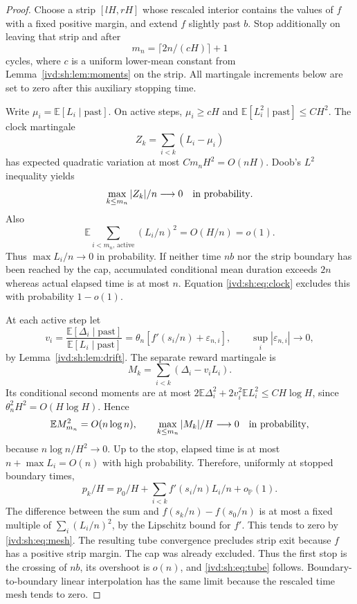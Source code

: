 \documentclass[11pt,letterpaper]{article}
\theoremstyle{remark}\newtheorem{remark}[theorem]{Remark}
\numberwithin{equation}{section}
\newcommand{\Prob}{\mathbb P}\newcommand{\E}{\mathbb E}
\begin{document}
\begin{proof}
Choose a strip $[lH,rH]$ whose rescaled interior contains the values
of $f$ with a fixed positive margin, and extend $f$ slightly past $b$.
Stop additionally on leaving that strip and after
\[
 m_n=\lceil2n/(cH)\rceil+1
\]
cycles, where $c$ is a uniform lower-mean constant from
Lemma~\ref{ivd:sh:lem:moments} on the strip. All martingale increments below
are set to zero after this auxiliary stopping time.

Write $\mu_i=\E[L_i\mid\text{past}]$. On active steps,
$\mu_i\ge cH$ and $\E[L_i^2\mid\text{past}]\le CH^2$.
The clock martingale
\[
 Z_k=\sum_{i<k}(L_i-\mu_i)
\]
has expected quadratic variation at most $Cm_nH^2=O(nH)$.
Doob's $L^2$ inequality yields
\begin{equation}\label{ivd:sh:eq:clock}
 \max_{k\le m_n}|Z_k|/n\longrightarrow0
 \quad\hbox{in probability}.
\end{equation}
Also
\begin{equation}\label{ivd:sh:eq:mesh}
 \E\sum_{i<m_n,\,\mathrm{active}}(L_i/n)^2=O(H/n)=o(1).
\end{equation}
Thus $\max L_i/n\to0$ in probability. If neither time $nb$ nor
the strip boundary has been reached by the cap, accumulated conditional
mean duration exceeds $2n$ whereas actual elapsed time is at most $n$.
Equation \eqref{ivd:sh:eq:clock} excludes this with probability $1-o(1)$.

At each active step let
\[
 v_i=\frac{\E[\Delta_i\mid\text{past}]}{\E[L_i\mid\text{past}]}
     =\theta_n[f'(s_i/n)+\varepsilon_{n,i}],
 \qquad \sup_i|\varepsilon_{n,i}|\to0,
\]
by Lemma~\ref{ivd:sh:lem:drift}. The separate reward martingale is
\[
 M_k=\sum_{i<k}(\Delta_i-v_iL_i).
\]
Its conditional second moments are at most
$2\E\Delta_i^2+2v_i^2\E L_i^2\le CH\log H$,
since $\theta_n^2H^2=O(H\log H)$. Hence
\begin{equation}\label{ivd:sh:eq:reward}
 \E M_{m_n}^2=O(n\log n),\qquad
 \max_{k\le m_n}|M_k|/H\longrightarrow0
 \quad\hbox{in probability},
\end{equation}
because $n\log n/H^2\to0$.
Up to the stop, elapsed time is at most $n+\max L_i=O(n)$ with
high probability. Therefore, uniformly at stopped boundary times,
\[
 p_k/H=p_0/H+\sum_{i<k}f'(s_i/n)L_i/n+o_{\Prob}(1).
\]
The difference between the sum and
$f(s_k/n)-f(s_0/n)$ is at most a fixed multiple of
$\sum_i(L_i/n)^2$, by the Lipschitz bound for $f'$.
This tends to zero by \eqref{ivd:sh:eq:mesh}.
The resulting tube convergence precludes strip exit because $f$ has
a positive strip margin. The cap was already excluded. Thus the first
stop is the crossing of $nb$, its overshoot is $o(n)$, and
\eqref{ivd:sh:eq:tube} follows. Boundary-to-boundary linear interpolation
has the same limit because the rescaled time mesh tends to zero.


\end{proof}
\end{document}
